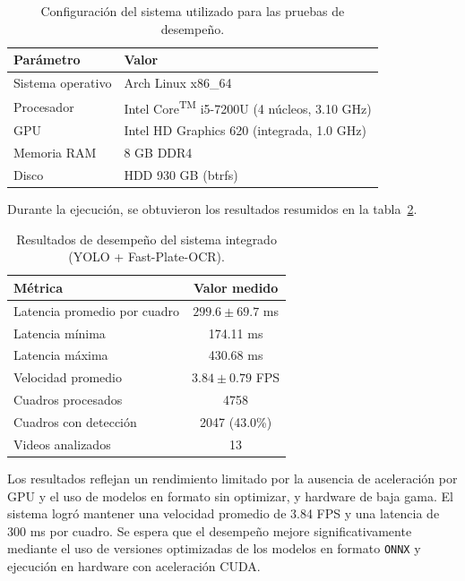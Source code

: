 \begin{table}[h]
	\centering
	\begin{tabular}{ll}
		\toprule
		\textbf{Parámetro} & \textbf{Valor} \\
		\midrule
		Sistema operativo & Arch Linux x86\_64 \\
		Procesador & Intel\textsuperscript{\textregistered} Core\textsuperscript{TM} i5-7200U (4 núcleos, 3.10 GHz) \\
		GPU & Intel HD Graphics 620 (integrada, 1.0 GHz) \\
		Memoria RAM & 8 GB DDR4 \\
		Disco & HDD 930 GB (btrfs) \\
		\bottomrule
	\end{tabular}
	\caption{Configuración del sistema utilizado para las pruebas de desempeño.}
	\label{tab:hardware}
\end{table}

Durante la ejecución, se obtuvieron los resultados resumidos en la tabla~\ref{tab:fps-metrics}.

\begin{table}[h]
        \centering
        \renewcommand{\arraystretch}{1.2}
        \begin{tabular}{lc}
                \toprule
                \textbf{Métrica} & \textbf{Valor medido} \\
                \midrule
                Latencia promedio por cuadro & $299.6 \pm 69.7$ ms \\
				Latencia mínima & 174.11 ms \\
				Latencia máxima & 430.68 ms \\
                Velocidad promedio & $3.84 \pm 0.79$ FPS  \\
                Cuadros procesados & 4758  \\
                Cuadros con detección & 2047 (43.0\%) \\
                Videos analizados & 13 \\
                \bottomrule
        \end{tabular}
        \caption{Resultados de desempeño del sistema integrado (YOLO + Fast-Plate-OCR).}
        \label{tab:fps-metrics}
\end{table}

Los resultados reflejan un rendimiento limitado por la ausencia de aceleración por GPU y 
el uso de modelos en formato sin optimizar, y hardware de baja gama. 
El sistema logró mantener una velocidad promedio de 3.84 FPS y una latencia de 300 ms por cuadro.
Se espera que el desempeño mejore significativamente mediante el uso de versiones optimizadas 
de los modelos en formato \texttt{ONNX} y ejecución en hardware con aceleración CUDA.

